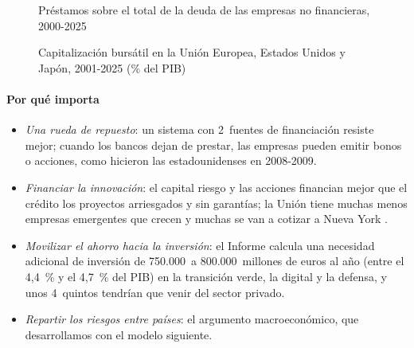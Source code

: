 \documentclass[11pt]{article}
\begin{document}
\begin{figure}[H]
\centering
\caption{Préstamos sobre el total de la deuda de las empresas no financieras, 2000-2025}\label{fig:financiacion}
\end{figure}

\begin{figure}[H]
\centering
\caption{Capitalización bursátil en la Unión Europea, Estados Unidos y Japón, 2001-2025 (\% del PIB)}\label{fig:capitalizacion}
\end{figure}

\paragraph{Por qué importa}

\begin{itemize}
\item \emph{Una rueda de repuesto}: un sistema con 2~fuentes de financiación resiste mejor; cuando los bancos dejan de prestar, las empresas pueden emitir bonos o acciones, como hicieron las estadounidenses en 2008-2009.
\item \emph{Financiar la innovación}: el capital riesgo y las acciones financian mejor que el crédito los proyectos arriesgados y sin garantías; la Unión tiene muchas menos empresas emergentes que crecen y muchas se van a cotizar a Nueva York .
\item \emph{Movilizar el ahorro hacia la inversión}: el Informe  calcula una necesidad adicional de inversión de 750.000~a 800.000~millones de euros al año (entre el 4,4~\% y el 4,7~\% del PIB) en la transición verde, la digital y la defensa, y unos 4~quintos tendrían que venir del sector privado\nocite{Draghi2024Future}.
\item \emph{Repartir los riesgos entre países}: el argumento macroeconómico, que desarrollamos con el modelo siguiente.
\end{itemize}
\end{document}
